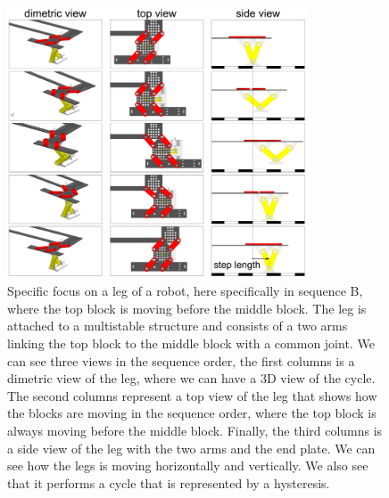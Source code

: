        
        \begin{figure}[h!]
            \centering
            \includegraphics[width=0.8\textwidth]{images/forward_step.png}
            \caption{Specific focus on a leg of a robot, here specifically in sequence B, where the top block is moving before the middle block. The leg is attached to a multistable structure and consists of a two arms linking the top block to the middle block with a common joint. We can see three views in the sequence order, the first columns is a dimetric view of the leg, where we can have a 3D view of the cycle. The second columns represent a top view of the leg that shows how the blocks are moving in the sequence order, where the top block is always moving before the middle block. Finally, the third columns is a side view of the leg with the two arms and the end plate. We can see how the legs is moving horizontally and vertically. We also see that it performs a cycle that is represented by a hysteresis.}
            \label{fig:forward_step}
        \end{figure}
        
